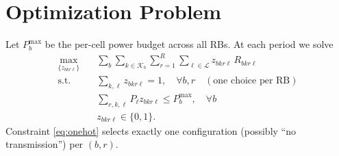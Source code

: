 \documentclass[10pt,conference]{IEEEtran}
\newcommand{\1}{\mathbf{1}}
\begin{document}
\section{Optimization Problem}
Let $P_b^{\max}$ be the per-cell power budget across all RBs. At each period we solve
\begin{align}
\max_{\{z_{bkr\ell}\}} \quad & \sum_{b}\sum_{k\in\mathcal{K}_b}\sum_{r=1}^R \sum_{\ell\in\mathcal{L}} z_{bkr\ell} \, R_{bkr\ell} \label{eq:origobj}\\
\text{s.t.}\quad & \sum_{k,\ell} z_{bkr\ell} = 1, \quad \forall b,r \quad (\text{one choice per RB}) \label{eq:onehot}\\
& \sum_{r,k,\ell} P_\ell z_{bkr\ell} \le P_b^{\max}, \quad \forall b \label{eq:budget}\\
& z_{bkr\ell}\in\{0,1\}. \nonumber
\end{align}
Constraint \eqref{eq:onehot} selects exactly one configuration (possibly ``no transmission'') per $(b,r)$.
\end{document}

